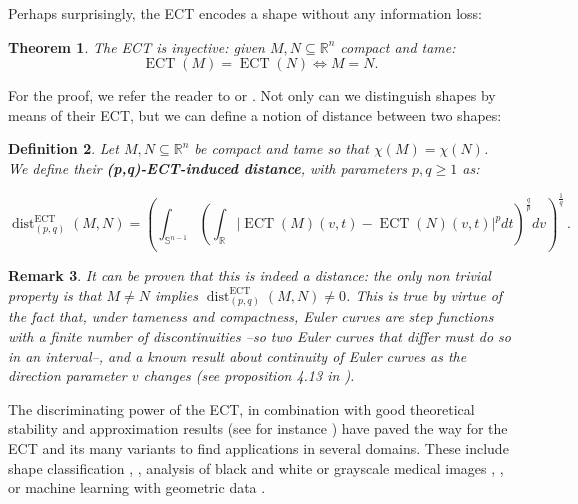 \documentclass[a4paper]{article}
\newtheorem{theorem}{Theorem}[section]
\newtheorem{definition}[theorem]{Definition}
\newtheorem{remark}[theorem]{Remark}
\newcommand{\ECT}{\operatorname{ECT}}
\newcommand{\bb}{\mathbb}
\newcommand{\dist}[2]{\operatorname{dist}^{\operatorname{ECT}}_{(#1, #2)}}
\begin{document}
Perhaps surprisingly, the ECT encodes a shape without any information loss:
\begin{theorem}
	The ECT is inyective: given $M, N \subseteq \mathbb R^n$ compact and tame:
	\[ \ECT(M)=\ECT(N) \iff M=N. \]
\end{theorem}
For the proof, we refer the reader to \cite{ghrist2018persistent} or \cite{curry2022many}. Not only can we distinguish shapes by means of their ECT, but we can define a notion of distance between two shapes:
\begin{definition}
	\label{DefDistClassic}
	Let $M,N\subseteq \mathbb R^n$ be compact and tame so that $\chi(M)=\chi(N)$. We define their \textbf{(p,q)-ECT-induced distance}, with parameters $p, q \geq 1$ as:
	
	\[
		\dist{p}{q}(M,N)=\left(\int_{\bb S^{n-1}} \left( \int_\bb R |\ECT(M)(v,t)-\ECT(N)(v,t)|^p dt \right)^{\frac{q}{p}} dv\right)^\frac{1}{q}\, .
	\]
\end{definition}
\begin{remark}
	It can be proven that this is indeed a distance: the only non trivial property is that $M\neq N$ implies $\dist{p}{q}(M,N)\neq0$. This is true by virtue of the fact that, under tameness and compactness, Euler curves are step functions with a finite number of discontinuities --so two Euler curves that differ must do so in an interval--, and a known result about continuity of Euler curves as the direction parameter $v$ changes (see proposition 4.13 in \cite{curry2022many}). 
\end{remark}

The discriminating power of the ECT, in combination with good theoretical stability and approximation results (see for instance \cite{curry2022many}) have paved the way for the ECT and its many variants to find applications in several domains. These include shape classification \cite{turner2014persistent}, \cite{wang2021statistical}, analysis of black and white or grayscale medical images \cite{wang2023hypothesis}, \cite{crawford2020predicting}, or machine learning with geometric data \cite{nadimpalli2023euler}.
\end{document}
